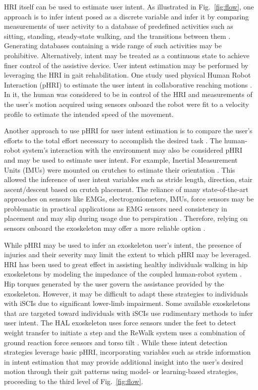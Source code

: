 HRI itself can be used to estimate user intent. As illustrated in Fig.~\ref{fig:flow}, one approach is to infer intent posed as a discrete variable and infer it by comparing measurements of user activity to a database of predefined activities such as sitting, standing, steady-state walking, and the transitions between them \cite{shen2013motion}. Generating databases containing a wide range of such activities may be prohibitive. Alternatively, intent may be treated as a continuous state to achieve finer control of the assistive device. User intent estimation may be performed by leveraging the HRI in gait rehabilitation. One study used physical Human Robot Interaction (pHRI) to estimate the user intent in collaborative reaching motions  \cite{corteville2007human}. In it, the human was considered to be in control of the HRI and measurements of the user's motion acquired using sensors onboard the robot were fit to a velocity profile to estimate the intended speed of the movement. 

Another approach to use pHRI for user intent estimation is to compare the user's efforts to the total effort necessary to accomplish the desired task \cite{pehlivan2015minimal}. The human-robot system's interaction with the environment may also be considered pHRI and may be used to estimate user intent. For example, Inertial Measurement Units (IMUs) were mounted on crutches to estimate their orientation \cite{brescianini2011ins}. This allowed the inference of user intent variables such as stride length, direction, stair ascent/descent based on crutch placement. The reliance of many state-of-the-art approaches on sensors like EMGs, electrogoniometers, IMUs, force sensors may be problematic in practical applications as EMG sensors need consistency in placement and may slip during usage due to perspiration \cite{tkach2010study,ison2014role}. Therefore, relying on sensors onboard the exoskeleton may offer a more reliable option \cite{Gambon20b}. 

While pHRI may be used to infer an exoskeleton user's intent, the presence of injuries and their severity may limit the extent to which pHRI may be leveraged. HRI has been used to great effect in assisting healthy individuals walking in hip exoskeletons by modeling the impedance of the coupled human-robot system \cite{zhang2019admittance,nagarajan2016integral}. Hip torques generated by the user govern the assistance provided by the exoskeleton. However, it may be difficult to adapt these strategies to individuals with iSCIs due to significant lower-limb impairment. Some available exoskeletons that are targeted toward individuals with iSCIs use rudimentary methods to infer user intent. The HAL exoskeleton uses force sensors under the feet to detect weight transfer to initiate a step \cite{suzuki2007intention} and the ReWalk system uses a combination of ground reaction force sensors and torso tilt \cite{goffer2012locomotion}. While these intent detection strategies leverage basic pHRI, incorporating variables such as stride information in intent estimation that may provide additional insight into the user's desired motion through their gait patterns using model- or learning-based strategies, proceeding to the third level of Fig.~\ref{fig:flow}.

